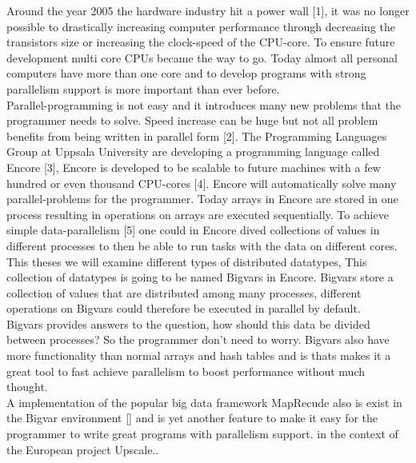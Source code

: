 Around the year 2005 the hardware industry hit a power wall [1], it was no longer possible to drastically increasing computer performance through decreasing the transistors size or increasing the clock-speed of the CPU-core. To ensure future development multi core CPUs became the way to go. Today almost all personal computers have more than one core and to develop programs with strong parallelism support is more important than ever before.\\

Parallel-programming is not easy and it introduces many new problems that the programmer needs to solve. Speed increase can be huge but not all problem benefits from being written in parallel form [2]. The Programming Languages Group at Uppsala University are developing a programming language called Encore [3], Encore is developed to be scalable to future machines with a few hundred or even thousand CPU-cores [4]. Encore will automatically solve many parallel-problems for the programmer. 
Today arrays in Encore are stored in one process resulting in operations on arrays are executed sequentially. To achieve simple data-parallelism [5] one could in Encore dived collections of values in different processes to then be able to run tasks with the data on different cores. \\

This theses we will examine different types of distributed datatypes, This collection of datatypes is going to be named Bigvars in Encore. Bigvars store a collection of values that are distributed among many processes, different operations on Bigvars could therefore be executed in parallel by default. \\

Bigvars provides answers to the question, how should this data be divided between processes? So the programmer don’t need to worry. Bigvars also have more functionality than normal arrays and hash tables and is thats makes it a great tool to fast achieve parallelism to boost performance without much thought. \\

A implementation of the popular big data framework MapRecude also is exist in the Bigvar environment [] and is yet another feature to make it easy for the programmer to write great programs with parallelism support. 
in the context of the European project Upscale.. 